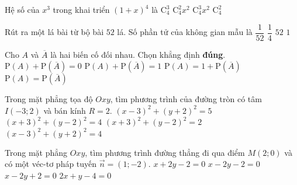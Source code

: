 \begin{ex}%
Hệ số của $x^3$ trong khai triển $(1+x)^4$ là 
	\choice
	{\True $\mathrm{C}_4^3$}
	{$\mathrm{C}_4^2 x^2$}
	{$\mathrm{C}_4^3 x^2$}
	{$\mathrm{C}_4^2$}
\end{ex}

\begin{ex}%
Rút ra một lá bài từ bộ bài $52$ lá. Số phần tử của không gian mẫu là
	\choice
	{$\dfrac{1}{52}$}
	{$\dfrac{1}{4}$}
	{\True $52$}
	{$1$}
\end{ex}

\begin{ex}%
Cho $A$ và $\overline{A}$ là hai biến cố đối nhau. Chọn khẳng định \textbf{đúng}.
	\choice
	{$\mathrm{P}(A)+\mathrm{P}(\overline{A})=0$}
	{\True $\mathrm{P}(A)+\mathrm{P}(\overline{A})=1$}
	{$\mathrm{P}(A)=1+\mathrm{P}(\overline{A})$}
	{$\mathrm{P}(A)=\mathrm{P}(\overline{A})$}
\end{ex}

\begin{ex}%
Trong mặt phẳng tọa độ $Oxy$, tìm phương trình của đường tròn có tâm $I(-3 ; 2)$ và bán kính $R=2$.
	\choice
	{$(x-3)^2+(y+2)^2=5$}
	{\True $(x+3)^2+(y-2)^2=4$}
	{$(x+3)^2+(y-2)^2=2$}
	{$(x-3)^2+(y+2)^2=4$}
\end{ex}

\begin{ex}%
Trong mặt phẳng $O x y$, tìm phương trình đường thẳng đi qua điểm $M(2 ; 0)$ và có một véc-tơ pháp tuyến $\vec{n}=(1 ;-2)$. 
	\choice
	{$x+2 y-2=0$}
	{\True $x-2 y-2=0$}
	{$x-2 y+2=0$}
	{$2 x+y-4=0$}
\end{ex}

